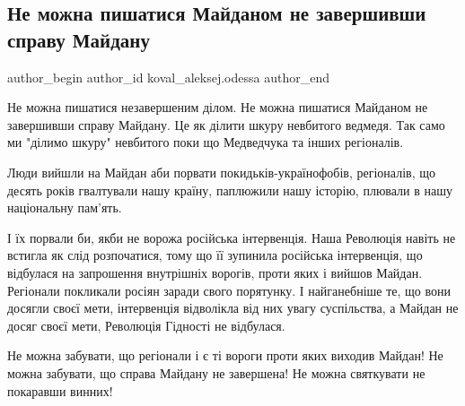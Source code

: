  
 
 
 
 
 
\subsection{Не можна пишатися Майданом не завершивши справу Майдану}
\label{sec:21_11_2021.fb.koval_aleksej.odessa.1.maidan_gordost}
 
\ifcmt
 author_begin
   author_id koval_aleksej.odessa
 author_end
\fi

Не можна пишатися незавершеним ділом. Не можна пишатися Майданом не завершивши
справу Майдану. Це як ділити шкуру невбитого ведмедя. Так само ми "ділимо
шкуру" невбитого поки що Медведчука та інших регіоналів. 

Люди вийшли на Майдан аби порвати покидьків-українофобів, регіоналів, що десять
років гвалтували нашу країну, паплюжили нашу історію, плювали в нашу
національну пам'ять.

І їх порвали би, якби не ворожа російська інтервенція. Наша Революція навіть не
встигла як слід розпочатися, тому що її зупинила російська інтервенція, що
відбулася на запрошення внутрішніх ворогів, проти яких і вийшов Майдан.
Регіонали покликали росіян заради свого порятунку. І найганебніше те, що вони
досягли своєї мети, інтервенція відволікла від них увагу суспільства, а Майдан
не досяг своєї мети, Революція Гідності не відбулася.

Не можна забувати, що регіонали і є ті вороги проти яких виходив Майдан! Не
можна забувати, що справа Майдану не завершена! Не можна святкувати не
покаравши винних!
